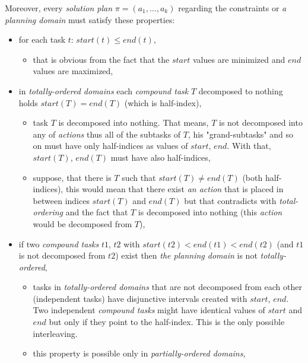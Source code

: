 \medskip\noindent
Moreover, every \emph{solution plan} $\pi = (a_1, \dots, a_k)$ regarding the constraints or \emph{a planning domain} must satisfy these properties:

\begin{itemize}
    \item for each task $t$: $start(t) \leq end(t)$,
    \begin{itemize}
        \item that is obvious from the fact that the $start$ values are minimized and $end$ values are maximized,
    \end{itemize}

    \item in \emph{totally-ordered domains} each \emph{compound task} $T$ decomposed to nothing holds $start(T) = end(T)$ (which is half-index),
    \begin{itemize}
        \item task $T$ is decomposed into nothing. That means, $T$ is not decomposed into any of \emph{actions} thus all of the subtasks of $T$, his "grand-subtasks" and so on must have only half-indices as values of $start$, $end$. With that, $start(T)$, $end(T)$ must have also half-indices,

        \item suppose, that there is $T$ such that $start(T) \neq end(T)$ (both half-indices), this would mean that there exist \emph{an action} that is placed in between indices $start(T)$ and $end(T)$ but that contradicts with \emph{total-ordering} and the fact that $T$ is decomposed into nothing (this \emph{action} would be decomposed from $T$),
    \end{itemize}

    \item if two \emph{compound tasks} $t1$, $t2$ with $start(t2) < end(t1) < end(t2)$ (and $t1$ is not decomposed from $t2$) exist then \emph{the planning domain} is not \emph{totally-ordered},
    \begin{itemize}
        \item tasks in \emph{totally-ordered domains} that are not decomposed from each other (independent tasks) have disjunctive intervals created with $start$, $end$. Two independent \emph{compound tasks} might have identical values of $start$ and $end$ but only if they point to the half-index. This is the only possible interleaving.

        \item this property is possible only in \emph{partially-ordered domains},
    \end{itemize}


\end{itemize}
